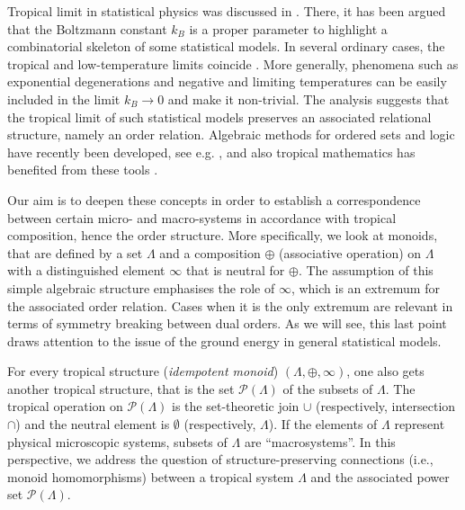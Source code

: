 \documentclass[11pt,british,reqno]{article}
\numberwithin{equation}{section}
\numberwithin{figure}{section}
\numberwithin{table}{section}
\theoremstyle{definition}
\theoremstyle{definition}
\theoremstyle{plain}
\theoremstyle{plain}
\theoremstyle{remark}
\theoremstyle{plain}
\numberwithin{equation}{section}
\numberwithin{figure}{section}
\numberwithin{table}{section}
\theoremstyle{plain}
\begin{document}
Tropical limit in statistical physics was discussed in \cite{AK2015}. There, it has been argued that the Boltzmann constant
$k_{B}$ is a proper parameter to highlight a combinatorial skeleton
of some statistical models. In several ordinary cases, the tropical
and low-temperature limits coincide \cite{Sturmfels2004,Kapranov2011,Marcolli2014}.
More generally, phenomena such as exponential degenerations
\cite{Pauling1935,Diep2005,GutzowSchemler2009} and negative
and limiting temperatures \cite{Ramsey1956,Rumer1960} can be easily included in the limit $k_{B}\rightarrow 0$ and make it non-trivial. 
The analysis suggests that the tropical limit of such statistical models preserves
an associated relational structure, namely an order relation. Algebraic
methods for ordered sets and logic have recently been developed, see
e.g. \cite{GuidoToto2008}, and also tropical mathematics has benefited
from these tools \cite{LS2014}. 

Our aim is to deepen these concepts in order to establish
a correspondence between certain micro- and macro-systems in accordance with
tropical composition, hence the order structure. More specifically, we look at monoids, that are defined by a set $\Lambda$ and a composition $\oplus$ (associative operation) on $\Lambda$ with a distinguished element $\infty$ that is neutral for $\oplus$. The assumption of this simple algebraic structure emphasises the role of $\infty$, which is an extremum for the associated order relation. Cases when it is the only extremum are relevant in terms of symmetry breaking between dual orders. As we will see, this last point draws attention to the issue of the ground energy in general statistical models. 

For every tropical structure (\emph{idempotent monoid}) $(\Lambda,\oplus,\infty)$, one also gets
another tropical structure, that is the set $\mathcal{P}(\Lambda)$
of the subsets of $\Lambda$. The tropical operation on $\mathcal{P}(\Lambda)$
is the set-theoretic join $\cup$ (respectively, intersection $\cap$)
and the neutral element is $\emptyset$ (respectively, $\Lambda$).
If the elements of $\Lambda$ represent physical microscopic systems, subsets
of $\Lambda$ are ``macrosystems''. In this perspective,
we address the question of structure-preserving connections (i.e., monoid
homomorphisms) between a tropical system $\Lambda$ and the associated
power set $\mathcal{P}(\Lambda)$. 
\end{document}

